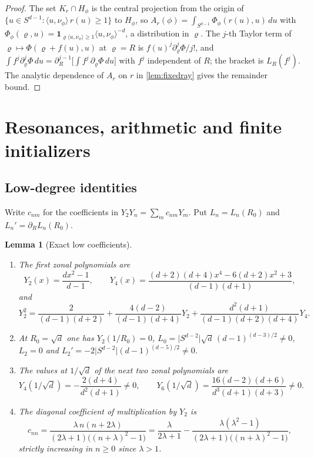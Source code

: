 \documentclass[11pt]{amsart}
\numberwithin{equation}{section}
\newtheorem{lemma}[theorem]{Lemma}
\theoremstyle{definition}
\theoremstyle{remark}
\newcommand{\abs}[1]{\lvert #1\rvert}
\begin{document}
\begin{proof}
The set $K_r\cap H_\phi$ is the central projection from the origin of $\{u\in S^{d-1}:\langle u,\nu_\phi\rangle\,r(u)\ge1\}$ to $H_\phi$, so $A_r(\phi)=\int_{S^{d-1}}\Phi_\phi(r(u),u)\,du$ with $\Phi_\phi(\varrho,u)=\mathbf 1_{\varrho\langle u,\nu_\phi\rangle\ge1}\langle u,\nu_\phi\rangle^{-d}$, a distribution in $\varrho$. The $j$-th Taylor term of $\varrho\mapsto\Phi(\varrho+f(u),u)$ at $\varrho=R$ is $f(u)^j\partial_\varrho^j\Phi/j!$, and $\int f^j\partial_\varrho^j\Phi\,du=\partial_R^{j-1}\bigl[\int f^j\,\partial_\varrho\Phi\,du\bigr]$ with $f^j$ independent of $R$; the bracket is $L_R(f^j)$. The analytic dependence of $A_r$ on $r$ in \cref{lem:fixedray} gives the remainder bound.
\end{proof}

\section{Resonances, arithmetic and finite initializers}\label{sec:resonances}

\subsection{Low-degree identities}
Write $c_{nm}$ for the coefficients in $Y_2Y_n=\sum_mc_{nm}Y_m$. Put $L_n=L_n(R_0)$ and $L_n'=\partial_RL_n(R_0)$.

\begin{lemma}[Exact low coefficients]\label{lem:low}
\begin{enumerate}[label=\textup{(\alph*)}]
\item The first zonal polynomials are
\[
Y_2(x)=\frac{dx^2-1}{d-1},\qquad Y_4(x)=\frac{(d+2)(d+4)x^4-6(d+2)x^2+3}{(d-1)(d+1)},
\]
and
\begin{equation}\label{eq:Y2sq}
Y_2^2=\frac2{(d-1)(d+2)}+\frac{4(d-2)}{(d-1)(d+4)}Y_2+\frac{d^2(d+1)}{(d-1)(d+2)(d+4)}Y_4 .
\end{equation}
\item At $R_0=\sqrt d$ one has $Y_2(1/R_0)=0$, $L_0=\abs{S^{d-2}}\sqrt d\,(d-1)^{(d-3)/2}\ne0$, $L_2=0$ and $L_2'=-2\abs{S^{d-2}}(d-1)^{(d-5)/2}\ne0$.
\item The values at $1/\sqrt d$ of the next two zonal polynomials are
\[
Y_4(1/\sqrt d)=-\frac{2(d+4)}{d^2(d+1)}\ne0,\qquad Y_6(1/\sqrt d)=\frac{16(d-2)(d+6)}{d^3(d+1)(d+3)}\ne0.
\]
\item The diagonal coefficient of multiplication by $Y_2$ is
\begin{equation}\label{eq:cnn}
c_{nn}=\frac{\lambda\,n(n+2\lambda)}{(2\lambda+1)\bigl((n+\lambda)^2-1\bigr)}=\frac\lambda{2\lambda+1}-\frac{\lambda(\lambda^2-1)}{(2\lambda+1)\bigl((n+\lambda)^2-1\bigr)},
\end{equation}
strictly increasing in $n\ge0$ since $\lambda>1$.
\end{enumerate}
\end{lemma}
\end{document}
